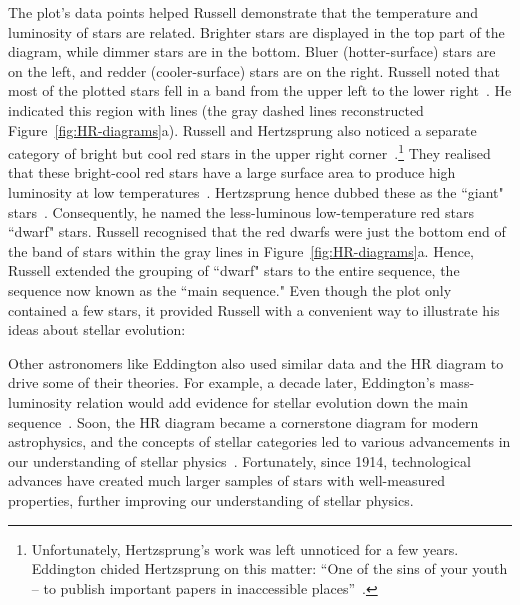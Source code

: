 The plot's data points helped Russell demonstrate that the temperature and luminosity of stars are related.
Brighter stars are displayed in the top part of the diagram, while dimmer stars are in the bottom. 
Bluer (hotter-surface) stars are on the left, and redder (cooler-surface) stars are on the right. 
Russell noted that most of the plotted stars fell in a band from the upper left to the lower right~\cite{Russell:1914:PA}.
He indicated this region with lines (the gray dashed lines reconstructed Figure~\ref{fig:HR-diagrams}a).
Russell and Hertzsprung also noticed a separate category of bright but cool red stars in the upper right corner~\cite{Russell:1914:PA, Hertzsprung:1911:POPot}.\footnote{Unfortunately, Hertzsprung's work was left unnoticed for a few years. Eddington chided Hertzsprung on this matter: ``One of the sins of your youth – to publish important papers in inaccessible
places''~\cite{Nielsen:1964:Cent}.}
They realised that these bright-cool red stars have a large surface area to produce high luminosity at low temperatures~\cite{Russell:1914:PA, Maury:1897:AnHar, Hertzsprung:1911:POPot}. 
Hertzsprung hence dubbed these as the ``giant" stars~\cite{Nielsen:1964:Cent}.  
Consequently, he named the less-luminous low-temperature red stars ``dwarf" stars. 
Russell recognised that the red dwarfs were just the bottom end of the band of stars within the gray lines in Figure~\ref{fig:HR-diagrams}a. 
Hence, Russell extended the grouping of ``dwarf" stars to the entire sequence, the sequence now known as the ``main sequence."
Even though the plot only contained a few stars, it provided Russell with a convenient way to illustrate his ideas about stellar evolution:

Other astronomers like Eddington also used similar data and the HR diagram to drive some of their theories. 
For example, a decade later, Eddington's mass-luminosity relation would add evidence for stellar evolution down the main sequence~\cite{Eddington:1924:MNRAS}.
Soon, the HR diagram became a cornerstone diagram for modern astrophysics, and the concepts of stellar categories led to various advancements in our understanding of stellar physics~\cite{Nielsen:1964:Cent, 1914_HR_data}. 
Fortunately, since 1914, technological advances have created much larger samples of stars with well-measured properties, further improving our understanding of stellar physics.


